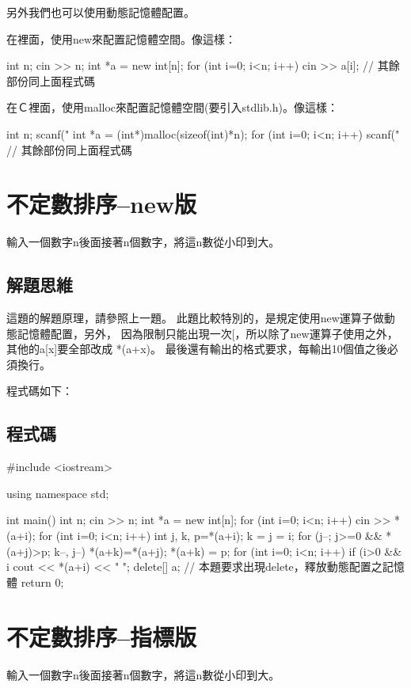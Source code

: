 另外我們也可以使用動態記憶體配置。

在\cc{}裡面，使用new來配置記憶體空間。像這樣：
\begin{inside}
	int n;  cin >> n;
	int *a = new int[n];
	for (int i=0; i<n; i++) cin >> a[i];
	// 其餘部份同上面程式碼
\end{inside}	

在Ｃ裡面，使用malloc來配置記憶體空間(要引入stdlib.h)。像這樣：
\begin{inside}
	int n;  scanf("%
	int *a = (int*)malloc(sizeof(int)*n);
	for (int i=0; i<n; i++) scanf("%
	// 其餘部份同上面程式碼
\end{inside}	


\section{不定數排序--new版}
輸入一個數字n後面接著n個數字，將這n數從小印到大。

\subsection{解題思維}
這題的解題原理，請參照上一題。
此題比較特別的，是規定使用new運算子做動態記憶體配置，另外，
因為限制只能出現一次[，所以除了new運算子使用之外，
其他的a[x]要全部改成 *(a+x)。
最後還有輸出的格式要求，每輸出10個值之後必須換行。

\vspace{0.5cm}
\noindent 程式碼如下：
\subsection{程式碼}
\begin{cppcode}
	#include <iostream>
	
	using namespace std;
	
	int main()
	{
		int n; cin >> n;
		int *a = new int[n];
		for (int i=0; i<n; i++) cin >> *(a+i);
		for (int i=0; i<n; i++) {
			int j, k, p=*(a+i);
			k = j = i;
			for (j--; j>=0 && *(a+j)>p; k--, j--) *(a+k)=*(a+j);
			*(a+k) = p;
		}
		for (int i=0; i<n; i++) {
			if (i>0 && i%
			cout << *(a+i) << " ";
		}
		delete[] a; // 本題要求出現delete，釋放動態配置之記憶體
		return 0;
	}
\end{cppcode}


\section{不定數排序--指標版}
輸入一個數字n後面接著n個數字，將這n數從小印到大。

